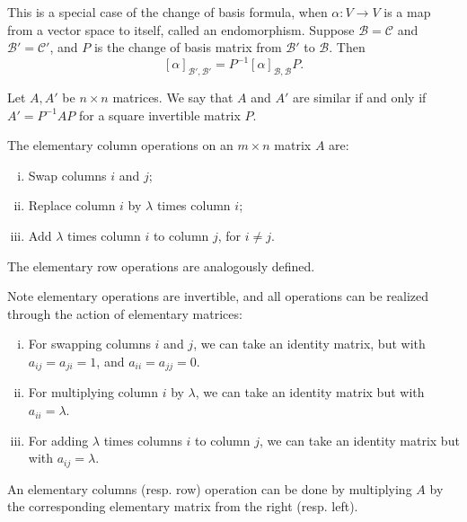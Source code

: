 \documentclass[12pt]{article}
\begin{document}
This is a special case of the change of basis formula, when $\alpha : V \to V$ is a map from a vector space to itself, called an endomorphism. Suppose $\mathcal{B} = \mathcal{C}$ and $\mathcal{B}' = \mathcal{C}'$, and $P$ is the change of basis matrix from $\mathcal{B}'$ to $\mathcal{B}$. Then
\[
	[\alpha]_{\mathcal{B'},  \mathcal{B}'} = P^{-1} [\alpha]_{\mathcal{B}, \mathcal{B}} P
.\]

\begin{definition}
	Let $A, A'$ be $n \times n$ matrices. We say that $A$ and $A'$ are similar if and only if $A' = P^{-1}AP$ for a square invertible matrix $P$.
\end{definition}

\begin{definition}
	The elementary column operations on an $m \times n$ matrix $A$ are:
	\begin{enumerate}[(i)]
		\item Swap columns $i$ and $j$;
		\item Replace column $i$ by $\lambda$ times column $i$;
		\item Add $\lambda$ times column $i$ to column $j$, for $i \neq j$.
	\end{enumerate}
	The elementary row operations are analogously defined.
\end{definition}

Note elementary operations are invertible, and all operations can be realized through the action of elementary matrices:
\begin{enumerate}[(i)]
	\item For swapping columns $i$ and $j$, we can take an identity matrix, but with $a_{ij} = a_{ji} = 1$, and $a_{ii} = a_{jj} = 0$.
	\item For multiplying column $i$ by $\lambda$, we can take an identity matrix but with $a_{ii} = \lambda$.
	\item For adding $\lambda$ times columns $i$ to column $j$, we can take an identity matrix but with $a_{ij} = \lambda$.
\end{enumerate}
An elementary columns (resp. row) operation can be done by multiplying $A$ by the corresponding elementary matrix from the right (resp. left).
\end{document}
